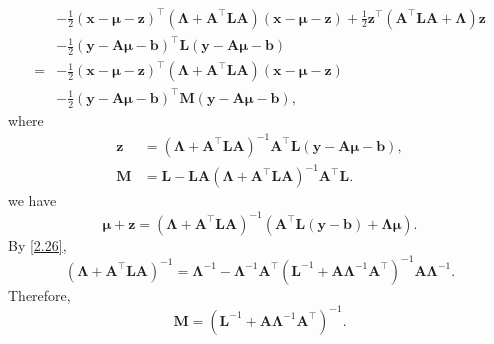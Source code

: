 \begin{equation}
\begin{aligned}
&-
\frac{1}{2}
(\mathbf{x} - \bm{\mu} - \mathbf{z}) ^ \intercal
\left(
	\bm{\Lambda}
	+
	\mathbf{A} ^ \intercal
	\mathbf{L}
	\mathbf{A}
\right)
(\mathbf{x} - \bm{\mu} - \mathbf{z})
+
\frac{1}{2}
\mathbf{z} ^ \intercal
\left(
	\mathbf{A} ^ \intercal
	\mathbf{L}
	\mathbf{A}
	+
	\bm{\Lambda}
\right)
\mathbf{z} \\
&-
\frac{1}{2}
(\mathbf{y} - \mathbf{A} \bm{\mu} - \mathbf{b}) ^ \intercal
\mathbf{L}
(\mathbf{y} - \mathbf{A} \bm{\mu} - \mathbf{b}) 
\\
=
&-
\frac{1}{2}
(\mathbf{x} - \bm{\mu} - \mathbf{z}) ^ \intercal
\left(
	\bm{\Lambda}
	+
	\mathbf{A} ^ \intercal
	\mathbf{L}
	\mathbf{A}
\right)
(\mathbf{x} - \bm{\mu} - \mathbf{z})
\\
&-
\frac{1}{2}
(\mathbf{y} - \mathbf{A} \bm{\mu} - \mathbf{b}) ^ \intercal
\mathbf{M}
(\mathbf{y} - \mathbf{A} \bm{\mu} - \mathbf{b}),
\end{aligned}
\end{equation}
%
where
%
\begin{equation}
\begin{aligned}
\mathbf{z}
&= 
\left( 
	\bm{\Lambda}
	+
	\mathbf{A} ^ \intercal
	\mathbf{L}
	\mathbf{A}
\right) ^ {- 1}
\mathbf{A} ^ \intercal
\mathbf{L}
(\mathbf{y} - \mathbf{A} \bm{\mu} - \mathbf{b}), 
\\
\mathbf{M}
&=
\mathbf{L}
-
\mathbf{L}
\mathbf{A}
\left( 
	\bm{\Lambda}
	+
	\mathbf{A} ^ \intercal
	\mathbf{L}
	\mathbf{A}
\right) ^ {- 1}
\mathbf{A} ^ \intercal
\mathbf{L}.
\end{aligned}
\end{equation}
%
we have
%
\begin{equation}
\bm{\mu}
+
\mathbf{z}
=
\left( 
	\bm{\Lambda}
	+
	\mathbf{A} ^ \intercal
	\mathbf{L}
	\mathbf{A}
\right) ^ {- 1}
\left(
	\mathbf{A} ^ \intercal
	\mathbf{L}
	(\mathbf{y} - \mathbf{b})
	+
	\bm{\Lambda}
	\bm{\mu}
\right).
\end{equation}
%
By \ref{2.26},
%
\begin{equation}
\left( 
	\bm{\Lambda}
	+
	\mathbf{A} ^ \intercal
	\mathbf{L}
	\mathbf{A}
\right) ^ {- 1}
=
\bm{\Lambda} ^ {- 1}
-
\bm{\Lambda} ^ {- 1}
\mathbf{A} ^ \intercal
\left(
	\mathbf{L} ^ {- 1}
	+
	\mathbf{A}
	\bm{\Lambda} ^ {- 1}
	\mathbf{A} ^ \intercal
\right) ^ {- 1}
\mathbf{A}
\bm{\Lambda} ^ {- 1}.
\end{equation}
%
Therefore,
%
\begin{equation}
\mathbf{M}
=
\left(
	\mathbf{L} ^ {- 1}
	+
	\mathbf{A}
	\bm{\Lambda} ^ {- 1}
	\mathbf{A} ^ \intercal
\right) ^ {- 1}.
\end{equation}
